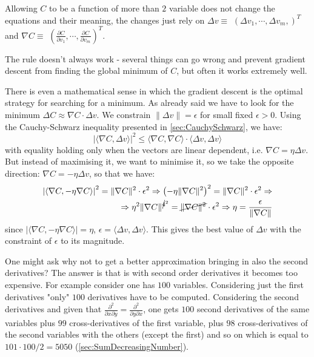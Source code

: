 Allowing $C$ to be a function of more than $2$ variable does not change the equations and their meaning, the changes just rely on $\Delta v \equiv $ $\left( \Delta v_1, \cdots, \Delta v_m, \right)^T$ and $\nabla C \equiv$ $\left( \frac{\partial C}{\partial v_1}, \cdots, \frac{\partial C}{\partial v_m}\right)^T$.

The rule doesn't always work - several things can go wrong and prevent gradient descent from finding the global minimum of $C$, but often it works extremely well.

There is even a mathematical sense in which the gradient descent is the optimal strategy for searching for a minimum. As already said we have to look for the minimum $\Delta C \approx \nabla C  \cdot \Delta v$. We constrain $\| \Delta v \| = \epsilon$ for small fixed  $\epsilon > 0$. Using the Cauchy-Schwarz inequality presented in \autoref{sec:CauchySchwarz}, we have:
\begin{equation}
\left| \langle \nabla C, \Delta v \rangle \right|^2 \le \langle \nabla C, \nabla C \rangle\cdot \langle \Delta v, \Delta v \rangle 
\end{equation}
with equality holding only when  the vectors are linear dependent, i.e. $\nabla C = \eta \Delta v$. But instead of maximising it, we want to minimise it, so we take the opposite direction: $\nabla C = -\eta \Delta v$, so that we have:
\begin{equation}
\begin{aligned}
\left| \langle  \nabla C, -\eta  \nabla C \rangle \right|^2 = \|\nabla C\|^2 \cdot \epsilon^2 
\Rightarrow \left( -\eta \|\nabla C\|^2\right)^2 =\|\nabla C\|^2 \cdot \epsilon^2 \Rightarrow \\
\Rightarrow \eta^2 \|\nabla C\|^{\cancel{4}^2} = \cancel{\|\nabla C\|^2} \cdot \epsilon^2
\Rightarrow \eta = \frac{\epsilon}{\|\nabla C\|}
\end{aligned}
\end{equation}
since $\left| \langle  \nabla C, -\eta  \nabla C \rangle \right| = \eta $, $\epsilon = \langle \Delta v, \Delta v \rangle $. This gives the best value of $\Delta v$ with the constraint of $\epsilon$ to its magnitude.

One might ask why not to get a better approximation bringing in also the second derivatives? The answer is that is with second order derivatives it becomes too expensive. For example consider one has $100$ variables. Considering just the first derivatives "only" $100$ derivatives have to be computed. Considering the second derivatives and given that $\frac{\partial^2}{\partial x \partial y} =  \frac{\partial^2}{ \partial y\partial x}$, one gets $100$ second derivatives of the same variables plus $99$ cross-derivatives of the first variable, plus $98$ cross-derivatives of the second variables with the others (except the first) and so on which is equal to $101\cdot 100 /2 = 5050$ (\autoref{sec:SumDecreasingNumber}).

